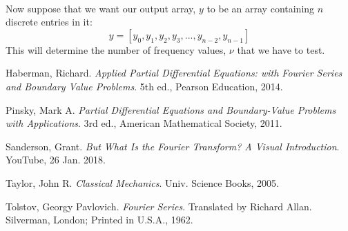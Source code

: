 \documentclass[12pt,letterpaper]{article}
\begin{document}
\paragraph*{}Now suppose that we want our output array, $y$ to be an array containing $n$ discrete entries in it:
\begin{equation}
y = [y_0 , y_1 , y_2 , y_3 , ... , y _{n-2} , y_{n-1} ]
\end{equation}
This will determine the number of frequency values, $\nu$ that we have to test. 


\begin{thebibliography}{9}


Haberman, Richard. \textit{Applied Partial Differential Equations: with Fourier Series and Boundary Value Problems}. 5th ed., Pearson Education, 2014.

Pinsky, Mark A. \textit{Partial Differential Equations and Boundary-Value Problems with Applications}. 3rd ed., American Mathematical Society, 2011.

Sanderson, Grant. \textit{But What Is the Fourier Transform? A Visual Introduction}. YouTube, 26 Jan. 2018.

Taylor, John R. \textit{Classical Mechanics}. Univ. Science Books, 2005.

Tolstov, Georgy Pavlovich. \textit{Fourier Series}. Translated by Richard Allan. Silverman, London; Printed in U.S.A., 1962.

\end{thebibliography}

\end{document}
